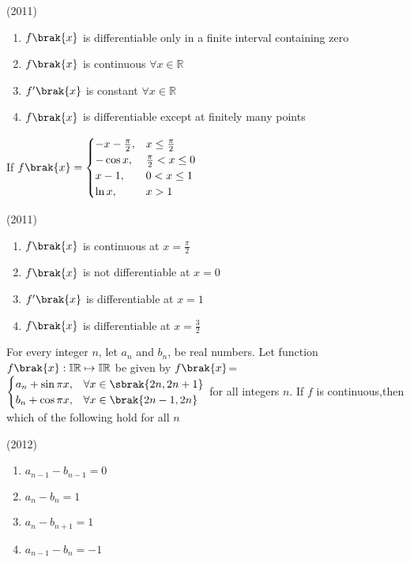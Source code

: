     \hfill(2011)
    
    \begin{enumerate}
	\item $f\brak{x}$ is differentiable only in a finite interval containing zero 
        \item $f\brak{x}$ is continuous $\forall x\in \mathbb{R}$
	\item $f^{\prime}\brak{x}$ is constant $\forall x\in \mathbb{R}$
        \item $f\brak{x}$ is differentiable except at finitely many points 
    \end{enumerate}


    \item 
    If $f\brak{x}= 
    \begin{cases}
        -x-\frac{\pi}{2}, & x\leq \frac{\pi}{2} \\
        -\cos x, & \frac{\pi}{2}<x\leq 0 \\
        x-1, & 0<x\leq1 \\
        \ln x, & x>1
    \end{cases}$ 

    \hfill(2011)
    
    \begin{enumerate}
        \item $f\brak{x}$ is continuous at $x=\frac{\pi}{2}$
        \item $f\brak{x}$ is not differentiable at $x=0$
	\item $f^{\prime}\brak{x}$ is differentiable at $x=1$
        \item $f\brak{x}$ is differentiable at $x=\frac{3}{2}$
    \end{enumerate}

    \item 
    For every integer $n$, let $a_n$ and $b_n$, be real numbers. Let function $f\brak{x}: \mathbb{IR} \mapsto \mathbb{IR}$ be given by
    $f\brak{x}$= 
    $\begin{cases}
       a_n+\sin\pi x, & \forall x\in \sbrak{2n,2n+1} \\
       b_n+\cos\pi x, & \forall x\in \brak{2n-1,2n}
    \end{cases}$
    for all integers $n$. If $f$ is continuous,then which of the following hold for all $n$ 

    \hfill(2012)
    
    \begin{enumerate}        
        \item $a_{n-1}-b_{n-1}=0$ 
        \item $a_n-b_n=1$ 
        \item $a_n-b_{n+1}=1$ 
        \item $a_{n-1}-b_n=-1$ 
    \end{enumerate}


